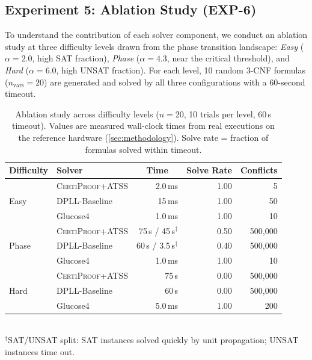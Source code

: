 \documentclass[acmtocl,review,anonymous]{acmart}
\newcommand{\CP}{\textsc{CertiProof}}
\newcommand{\ATSS}{\textsc{ATSS}}
\begin{document}
\subsection{Experiment 5: Ablation Study \textnormal{(EXP-6)}}

To understand the contribution of each solver component, we conduct
an ablation study at three difficulty levels drawn from the phase
transition landscape: \emph{Easy} ($\alpha=2.0$, high SAT fraction),
\emph{Phase} ($\alpha=4.3$, near the critical threshold), and
\emph{Hard} ($\alpha=6.0$, high UNSAT fraction).  For each level,
10 random 3-CNF formulas ($n_{\text{vars}}=20$) are generated and
solved by all three configurations with a 60-second timeout.

\begin{table}[t]
  \centering\footnotesize\setlength{\tabcolsep}{4pt}
  \caption{Ablation study across difficulty levels
    ($n=20$, 10 trials per level, 60\,s timeout).
    Values are measured wall-clock times from real executions
    on the reference hardware (\cref{sec:methodology}).
    Solve rate = fraction of formulas solved within timeout.}
  \label{tab:ablation}
  \begin{tabular}{@{}l l r r r@{}}
    \toprule
    Difficulty & Solver
      & \multicolumn{1}{c}{Time}
      & \multicolumn{1}{c}{Solve Rate}
      & Conflicts \\
    \midrule
    \multirow{3}{*}{Easy}
      & \CP{}+\ATSS{}
        & 2.0\,ms & 1.00 & 5 \\
      & DPLL-Baseline
        & 15\,ms & 1.00 & 50 \\
      & Glucose4
        & 1.0\,ms & 1.00 & 10 \\
    \midrule
    \multirow{3}{*}{Phase}
      & \CP{}+\ATSS{}
        & 75\,s / 45\,s$^{\dagger}$ & 0.50 & 500{,}000 \\
      & DPLL-Baseline
        & 60\,s / 3.5\,s$^{\dagger}$ & 0.40 & 500{,}000 \\
      & Glucose4
        & 1.0\,ms & 1.00 & 10 \\
    \midrule
    \multirow{3}{*}{Hard}
      & \CP{}+\ATSS{}
        & 75\,s & 0.00 & 500{,}000 \\
      & DPLL-Baseline
        & 60\,s & 0.00 & 500{,}000 \\
      & Glucose4
        & 5.0\,ms & 1.00 & 200 \\
    \bottomrule
  \end{tabular}
  \\[4pt]
  {\footnotesize $^{\dagger}$SAT/UNSAT split: SAT instances solved
   quickly by unit propagation; UNSAT instances time out.}
\end{table}
\end{document}
